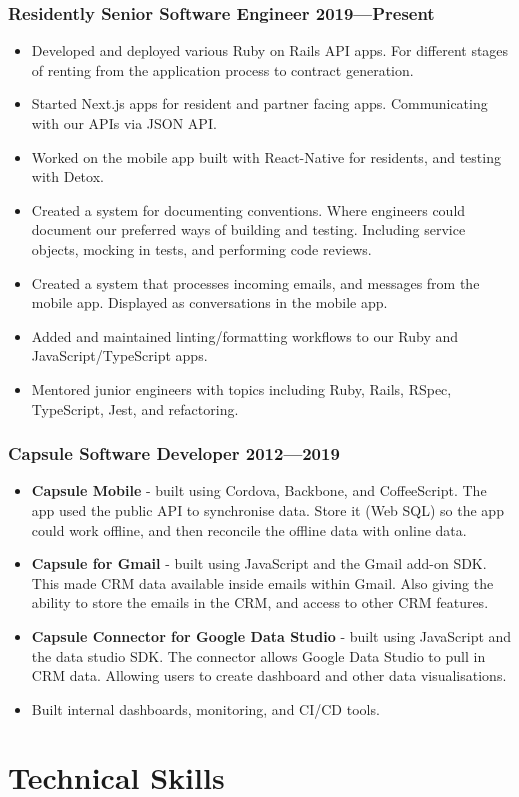 \documentclass[a4paper]{article}
\newcommand{\datedsubsection}[2]{
  \subsubsection{#1 \hfill \textbf{#2}}
}
\begin{document}
\datedsubsection{\textbf{Residently} Senior Software Engineer}{2019---Present}
\begin{itemize}
  \item Developed and deployed various Ruby on Rails API apps. For different stages of renting from the application process to contract generation.
  \item Started Next.js apps for resident and partner facing apps. Communicating with our APIs via JSON API.
  \item Worked on the mobile app built with React-Native for residents, and testing with Detox.
  \item Created a system for documenting conventions. Where engineers could document our preferred ways of building and testing. Including service objects, mocking in tests, and performing code reviews.
  \item Created a system that processes incoming emails, and messages from the mobile app. Displayed as conversations in the mobile app.
  \item Added and maintained linting/formatting workflows to our Ruby and JavaScript/TypeScript apps.
  \item Mentored junior engineers with topics including Ruby, Rails, RSpec, TypeScript, Jest, and refactoring.
\end{itemize}

\datedsubsection{\textbf{Capsule} Software Developer}{2012---2019}
\begin{itemize}
  \item \textbf{Capsule Mobile} - built using Cordova, Backbone, and CoffeeScript. The app used the public API to synchronise data. Store it (Web SQL) so the app could work offline, and then reconcile the offline data with online data. 
  \item \textbf{Capsule for Gmail} - built using JavaScript and the Gmail add-on SDK. This made CRM data available inside emails within Gmail. Also giving the ability to store the emails in the CRM, and access to other CRM features. 
  \item \textbf{Capsule Connector for Google Data Studio} - built using JavaScript and the data studio SDK. The connector allows Google Data Studio to pull in CRM data. Allowing users to create dashboard and other data visualisations.
  \item Built internal dashboards, monitoring, and CI/CD tools.
\end{itemize}

\section{Technical Skills}
\end{document}
